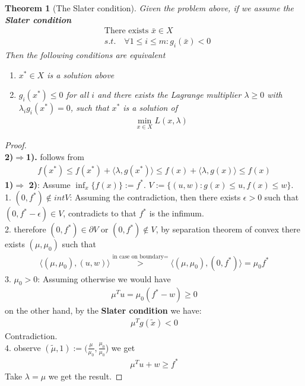 \documentclass[a4paper,12pt,oneside,fleqn]{book}
\newtheorem{theorem}{Theorem}[section]
\theoremstyle{definition}
\theoremstyle{remark}
\begin{document}
 \begin{theorem}[The Slater condition]
 	Given the problem above, if we assume the \textbf{Slater condition}
 	\begin{align*}
 		&\text{There exists } \bar{x} \in X\\
 		&s.t. \quad \forall 1 \le i \le m: g_i(\bar{x}) < 0 
 	\end{align*}
 	Then the following conditions are equivalent
 	\begin{enumerate}
 		\item $x^* \in X$ is a solution above
 		\item $g_i(x^*) \le 0 $ for all $i$ and there exists the Lagrange multiplier $\lambda \ge 0 $ with $\lambda_i g_i(x^*) = 0$, such that $x^*$ is a solution of 
 		\begin{align*}
 			\min_{x \in X} L(x , \lambda)
 		\end{align*}
 	\end{enumerate}
 \end{theorem}
 \begin{proof}
 \quad\\
 \textbf{2)}$\Rightarrow$\textbf{1).} follows from
 \begin{align*}
 	f(x^*) \le f(x^*) + \langle \lambda, g(x^*) \rangle \le f(x) + \langle \lambda, g(x) \rangle \le f(x)
 \end{align*}
 \textbf{1)}$\Rightarrow$ \textbf{2)}: Assume $\inf_x \{f(x)\} := f^*$. $V:= \{ (u, w): g(x) \le u, f(x) \le w \}$. \\
 1. $(0, f^*) \notin intV$: Assuming the contradiction, then there exists $\epsilon > 0$ such that $(0, f^* - \epsilon) \in V$, contradicts to that $f^*$ is the infimum. \\
 2. therefore $(0, f^*) \in \partial V$ or $(0, f^*) \notin V$, by separation theorem of convex there exists $(\mu, \mu_0)$ such that 
 \begin{align*}
 	\langle (\mu, \mu_0),  (u , w) \rangle \overset{\text{in case on boundary} = }{ >}  \langle (\mu, \mu_0), (0,f^*) \rangle = \mu_0 f^*
 \end{align*}
 3. $\mu_0 > 0$: Assuming otherwise we would have 
 \begin{align*}
 	\mu^T u = \mu_0(f^* - w) \geq 0
 \end{align*}
 on the other hand, by the \textbf{Slater condition} we have:
 \begin{align*}
 	\mu^T g(\tilde{x}) < 0
 \end{align*}
 Contradiction. \\
 4. observe $(\tilde{\mu}, 1) := (\frac{\mu}{\mu_0}, \frac{\mu_0}{\mu_0}$) we get 
 \begin{align*}
 	\mu^T u + w \ge f^*
 \end{align*}
 Take $\lambda = \mu$ we get the result. 
 \end{proof}
\end{document}
